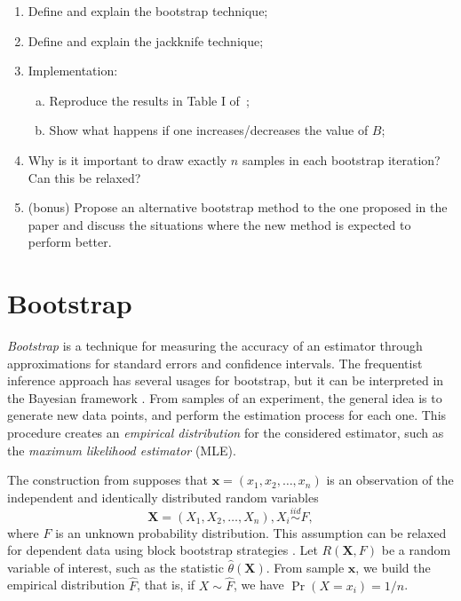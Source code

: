 \documentclass[a4paper,10pt, notitlepage]{report}
\begin{document}
\begin{enumerate}
 \item Define and explain the bootstrap technique;
 \item Define and explain the jackknife technique;
 \item Implementation:
\begin{enumerate}[(a)]
   \item Reproduce the results in Table I of~\cite{Efron1986};
   \item Show what happens if one increases/decreases the value of $B$;
 \end{enumerate} 
 \item Why is it important to draw exactly $n$ samples in each bootstrap iteration? Can this be relaxed?
 \item (bonus) Propose an alternative bootstrap method to the one proposed in the paper and discuss the situations where the new method is expected to perform better.
\end{enumerate}

\section*{Bootstrap}

{\em Bootstrap} is a technique for measuring the accuracy of an estimator through
approximations for standard errors and confidence intervals. The
frequentist inference approach has several usages for bootstrap, but it can be
interpreted in the Bayesian framework \cite[]{rubin1981bayesian}. From
samples of an experiment, the general idea is to generate new data points, and perform the
estimation process for each one. This procedure creates an {\em empirical
distribution} for the considered estimator, such as the {\em maximum likelihood
estimator} (MLE).

The construction from \cite{Efron1986} supposes that $\boldsymbol{x} = (x_1, x_2,
\dots, x_n)$ is an observation of the independent and identically distributed
random variables 
$$
\boldsymbol{X} = (X_1, X_2, \dots, X_n), X_i \overset{iid}{\sim} F, 
$$
where $F$ is an unknown probability distribution. This assumption can be
relaxed for dependent data using block bootstrap strategies
\cite[]{lahiri1999theoretical}. Let $R(\boldsymbol{X}, F)$ be a random 
variable of interest, such as the statistic $\hat{\theta}(\boldsymbol{X})$. 
From sample $\boldsymbol{x}$, we build the empirical distribution
$\hat{F}$, that is, if $X \sim \hat{F}$, we have $\Pr(X = x_i) = 1/n$.
\end{document}
